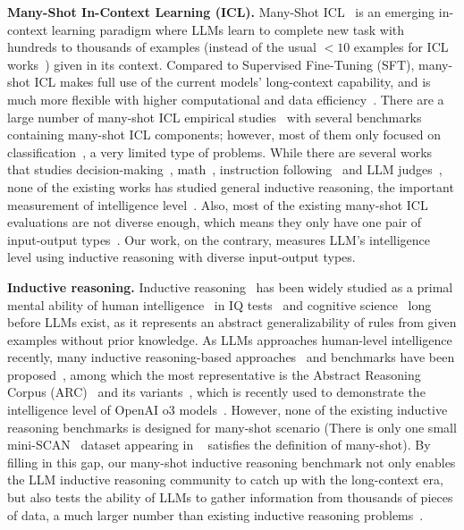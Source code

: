 \textbf{Many-Shot In-Context Learning (ICL).} Many-Shot ICL~\citep{agarwal2024many} is an emerging in-context learning paradigm where LLMs learn to complete new task with hundreds to thousands of examples (instead of the usual $<10$ examples for ICL works~\citep{li2024mirage, chollet2019measure, xu2023llms}) given in its context. Compared to Supervised Fine-Tuning (SFT), many-shot ICL makes full use of the current models' long-context capability, and is much more flexible with higher computational and data efficiency~\citep{agarwal2024many}. There are a large number of many-shot ICL empirical studies~\citep{bertsch2024context, zhao2024probing, song2024can, zhao2024context} with several benchmarks~\citep{yen2024helmet,li2024long, zou2024retrieval, ruoss2024lmact} containing many-shot ICL components; however, most of them only focused on classification~\citep{zhao2024probing, li2024long, li2023context, jiang2024many, bertsch2024context}, a very limited type of problems. While there are several works that studies decision-making~\citep{ruoss2024lmact}, math~\citep{agarwal2024many}, instruction following~\citep{zhao2024context} and LLM judges~\citep{song2024can}, none of the existing works has studied general inductive reasoning, the important measurement of intelligence level~\citep{chollet2019measure}. Also, most of the existing many-shot ICL evaluations are not diverse enough, which means they only have one pair of input-output types~\citep{ruoss2024lmact, jiang2024many}. Our work, on the contrary, measures LLM's intelligence level using inductive reasoning with diverse input-output types.

\textbf{Inductive reasoning.} Inductive reasoning~\citep{hayes2010inductive} has been widely studied as a primal mental ability of human intelligence~\citep{Kinshuk01052006} in IQ tests~\citep{ferrara1986children} and cognitive science~\citep{bisanz1994inductive, heit2000properties} long before LLMs exist, as it represents an abstract generalizability of rules from given examples without prior knowledge. As LLMs approaches human-level intelligence recently, many inductive reasoning-based approaches~\citep{qiu2023phenomenal, wang2023hypothesis} and benchmarks have been proposed~\citep{chollet2019measure,ma2024kor,  li2024mirage, xiao2024logicvista, banatt2024wilt}, among which the most representative is the Abstract Reasoning Corpus (ARC)~\citep{chollet2019measure} and its variants~\citep{kim2022playgrounds, xu2023llms}, which is recently used to demonstrate the intelligence level of OpenAI o3 models~\citep{o3}. However, none of the existing inductive reasoning benchmarks is designed for many-shot scenario (There is only one small mini-SCAN~\citep{qiu2023phenomenal, lake2019human} dataset appearing in ~\citet{qiu2023phenomenal} satisfies the definition of many-shot). By filling in this gap, our many-shot inductive reasoning benchmark not only enables the LLM inductive reasoning community to catch up with the long-context era, but also tests the ability of LLMs to gather information from thousands of pieces of data, a much larger number than existing inductive reasoning problems~\citep{chollet2019measure, li2024mirage}.

